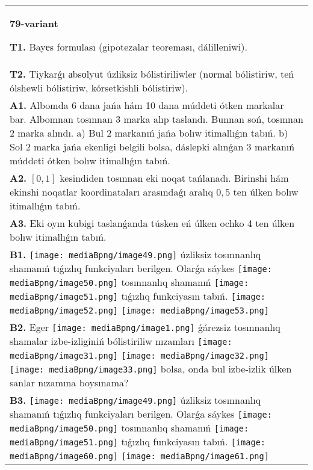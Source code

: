 \documentclass{article}
\begin{document}
\begin{tabular}{m{17cm}}
\textbf{79-variant}
\newline

\textbf{T1.} Bayеs formulası (gipotezalar teoreması, dálilleniwi).
 \\
\textbf{T2.} Tiykarǵı аbsоlyut úzliksiz bólistiriliwler (nоrmаl bólistiriw, teń ólshewli bólistiriw, kórsetkishli bólistiriw). 
 \\
\textbf{A1.} Albomda 6 dana jańa hám 10 dana múddeti ótken markalar bar. Albomnan tosınnan 3 marka alıp taslandı. Bunnan soń, tosınnan 2 marka alındı. a) Bul 2 markanıń jańa bolıw itimallıǵın tabıń. b) Sol 2 marka jańa ekenligi belgili bolsa, dáslepki alınǵan 3 markanıń múddeti ótken bolıw itimallıǵın tabıń.
 \\
\textbf{A2.} $\left[ 0,1 \right]$ kesindiden tosınnan eki noqat tańlanadı. Birinshi hám ekinshi noqatlar koordinataları arasındaǵı aralıq $0,5$ ten úlken bolıw itimallıǵın tabıń.
 \\
\textbf{A3.} Eki oyın kubigi taslanǵanda túsken eń úlken ochko 4 ten úlken bolıw itimallıǵın tabıń.
 \\
\textbf{B1.} 
\texttt{[image: mediaBpng/image49.png]} úzliksiz tosınnanlıq shamanıń tıǵızlıq funkciyaları berilgen. Olarǵa sáykes \texttt{[image: mediaBpng/image50.png]} tosınnanlıq shamanıń \texttt{[image: mediaBpng/image51.png]} tıǵızlıq funkciyasın tabıń. \texttt{[image: mediaBpng/image52.png]} \texttt{[image: mediaBpng/image53.png]}
 \\
\textbf{B2.} Eger \texttt{[image: mediaBpng/image1.png]} ǵárezsiz tosınnanlıq shamalar izbe-izliginiń bólistiriliw nızamları
\texttt{[image: mediaBpng/image31.png]} \texttt{[image: mediaBpng/image32.png]} \texttt{[image: mediaBpng/image33.png]}
bolsa, onda bul izbe-izlik úlken sanlar nızamına boysınama?
 \\
\textbf{B3.} \texttt{[image: mediaBpng/image49.png]} úzliksiz tosınnanlıq shamanıń tıǵızlıq funkciyaları berilgen. Olarǵa sáykes \texttt{[image: mediaBpng/image50.png]} tosınnanlıq shamanıń \texttt{[image: mediaBpng/image51.png]} tıǵızlıq funkciyasın tabıń. \texttt{[image: mediaBpng/image60.png]} \texttt{[image: mediaBpng/image61.png]}

\end{tabular}
\end{document}
